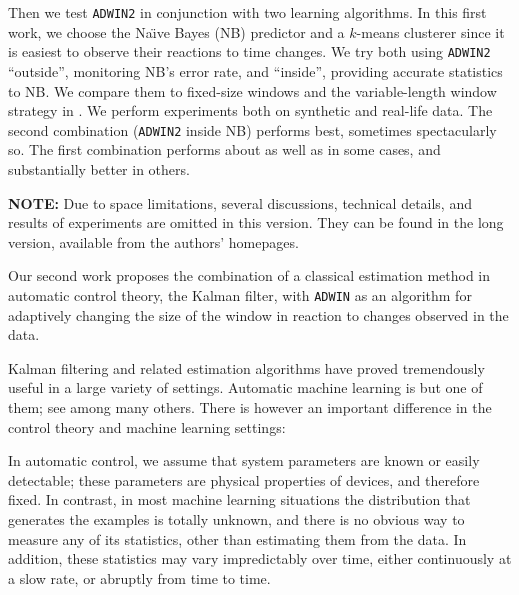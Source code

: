 Then we test {\tt ADWIN2} in conjunction with two %
learning algorithms.
In this first work, we choose the Na\"\i ve Bayes (NB) predictor  and a $k$-means clusterer since
it is easiest to observe their reactions %
 to time changes. %
We try both using {\tt ADWIN2} ``outside'', monitoring NB's
error rate, and ``inside'', providing accurate statistics to NB.
We compare them to fixed-size windows and the 
 variable-length window strategy in \cite{Gama}.
We perform experiments both on synthetic and real-life data.
The second combination ({\tt ADWIN2} inside NB) performs best, sometimes
spectacularly so. The first combination performs about as well
as \cite{Gama} in some cases, and substantially better in others.

\BEGINOMIT
{\bf NOTE:} Due to space limitations, several discussions,
technical details, and results of experiments are omitted in this 
version. They can be found in the long version, available from the authors'
homepages.
\ENDOMIT

Our second work \cite{Kbif-gav} proposes the combination of a classical estimation method
in automatic control theory, the Kalman filter, with 
{\tt ADWIN} as an algorithm for adaptively changing the size of the window in reaction to changes observed in the data. 

Kalman filtering and related estimation algorithms
have proved tremendously useful in a large variety of settings. 
Automatic machine learning is but one of them; 
see  \cite{gama-apneas,jacob-04} among many others. 
There is however an important difference in the 
control theory and machine learning settings: 

In automatic control, we assume that system parameters are known or easily detectable; 
these parameters are physical properties of devices, and therefore fixed. 
In contrast, in most machine learning situations the distribution that generates the examples
is totally unknown, and there is no obvious way to measure any of its statistics, 
other than estimating them from the data. In addition, these statistics 
may vary impredictably over time, either continuously at a slow rate, or abruptly from time to time. 

